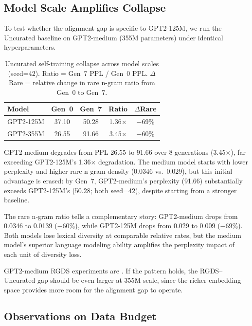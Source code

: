 \subsection{Model Scale Amplifies Collapse}
\label{sec:scale}

To test whether the alignment gap is specific to GPT2-125M, we run the Uncurated baseline on GPT2-medium (355M parameters) under identical hyperparameters.

\begin{table}[t]
\centering
\small
\begin{tabular}{lcccc}
\toprule
\textbf{Model} & \textbf{Gen~0} & \textbf{Gen~7} & \textbf{Ratio} & \textbf{$\Delta$Rare} \\
\midrule
GPT2-125M & 37.10 & 50.28 & 1.36$\times$ & $-$69\% \\
GPT2-355M & 26.55 & 91.66 & 3.45$\times$ & $-$60\% \\
\bottomrule
\end{tabular}
\caption{Uncurated self-training collapse across model scales (seed=42). Ratio = Gen~7 PPL / Gen~0 PPL. $\Delta$Rare = relative change in rare n-gram ratio from Gen~0 to Gen~7.}
\label{tab:scale}
\end{table}

GPT2-medium degrades from PPL 26.55 to 91.66 over 8 generations (3.45$\times$), far exceeding GPT2-125M's 1.36$\times$ degradation. The medium model starts with lower perplexity and higher rare n-gram density (0.0346 vs.\ 0.029), but this initial advantage is erased: by Gen~7, GPT2-medium's perplexity (91.66) substantially exceeds GPT2-125M's (50.28; both seed=42), despite starting from a stronger baseline.

The rare n-gram ratio tells a complementary story: GPT2-medium drops from 0.0346 to 0.0139 ($-$60\%), while GPT2-125M drops from 0.029 to 0.009 ($-$69\%). Both models lose lexical diversity at comparable relative rates, but the medium model's superior language modeling ability amplifies the perplexity impact of each unit of diversity loss.

GPT2-medium RGDS experiments are . If the pattern holds, the RGDS--Uncurated gap should be even larger at 355M scale, since the richer embedding space provides more room for the alignment gap to operate.

\subsection{Observations on Data Budget}
\label{sec:budget}


